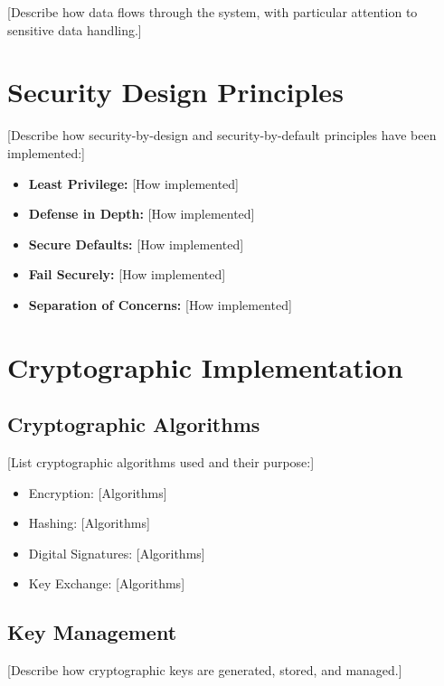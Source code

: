 \documentclass[
  11 pt,
  a4paper,
  table]{report}
\providecommand{\tightlist}{%
  \setlength{\itemsep}{0pt}\setlength{\parskip}{0pt}}\usepackage{longtable,booktabs,array}
\begin{document}
{[}Describe how data flows through the system, with particular attention
to sensitive data handling.{]}

\section{Security Design Principles}\label{security-design-principles}

{[}Describe how security-by-design and security-by-default principles
have been implemented:{]}

\begin{itemize}
\tightlist
\item
  \textbf{Least Privilege:} {[}How implemented{]}
\item
  \textbf{Defense in Depth:} {[}How implemented{]}
\item
  \textbf{Secure Defaults:} {[}How implemented{]}
\item
  \textbf{Fail Securely:} {[}How implemented{]}
\item
  \textbf{Separation of Concerns:} {[}How implemented{]}
\end{itemize}

\section{Cryptographic
Implementation}\label{cryptographic-implementation}

\subsection{Cryptographic Algorithms}\label{cryptographic-algorithms}

{[}List cryptographic algorithms used and their purpose:{]}

\begin{itemize}
\tightlist
\item
  Encryption: {[}Algorithms{]}
\item
  Hashing: {[}Algorithms{]}
\item
  Digital Signatures: {[}Algorithms{]}
\item
  Key Exchange: {[}Algorithms{]}
\end{itemize}

\subsection{Key Management}\label{key-management}

{[}Describe how cryptographic keys are generated, stored, and
managed.{]}
\end{document}
